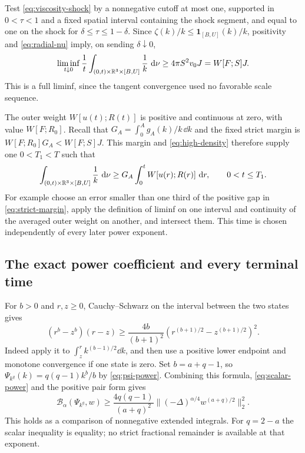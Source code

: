 Test \eqref{eq:viscosity-shock} by a nonnegative cutoff at most one,
supported in $0<\tau<1$ and a fixed spatial interval containing the
shock segment, and equal to one on the shock for
$\delta\leq\tau\leq1-\delta$. Since
$\zeta(k)/k\leq\mathbf1_{[B,U]}(k)/k$, positivity and
\eqref{eq:radial-nu} imply, on sending $\delta\downarrow0$,
\begin{equation}\label{eq:high-density}
 \liminf_{t\downarrow0}\frac1t
 \int_{(0,t)\times\mathbb R^3\times[B,U]}\frac1k\,\,\mathrm d\nu
 \geq4\pi S^2v_0J=W[F;S]J.
\end{equation}
This is a full liminf, since the tangent convergence used no favorable
scale sequence.

The outer weight $W[u(t);R(t)]$ is positive and continuous at zero, with
value $W[F;R_0]$. Recall that $G_A=\int_0^A g_A(k)/k\,\dd k$ and
the fixed strict margin is $W[F;R_0]G_A<W[F;S]J$. This margin and
\eqref{eq:high-density} therefore supply one $0<T_1<T$ such that
\begin{equation}\label{eq:payment}
 \int_{(0,t)\times\mathbb R^3\times[B,U]}\frac1k\,\,\mathrm d\nu
 \geq G_A\int_0^tW[u(r);R(r)]\,\,\mathrm d r,
 \qquad0<t\leq T_1.
\end{equation}
For example choose an error smaller than one third of the positive gap in
\eqref{eq:strict-margin}, apply the definition of liminf on one interval
and continuity of the averaged outer weight on another, and intersect
them. This time is chosen independently of every later power exponent.

\subsection{The exact power coefficient and every terminal time}

For $b>0$ and $r,z\geq0$, Cauchy--Schwarz on the interval between the
two states gives
\begin{equation}\label{eq:scalar-power}
 (r^b-z^b)(r-z)\geq\frac{4b}{(b+1)^2}
       (r^{(b+1)/2}-z^{(b+1)/2})^2.
\end{equation}
Indeed apply it to $\int_z^r k^{(b-1)/2}\dd k$, and then use a positive
lower endpoint and monotone convergence if one state is zero.
Set $b=a+q-1$, so
$\Psi_{k^q}(k)=q(q-1)k^b/b$ by \eqref{eq:psi-power}.
Combining this formula, \eqref{eq:scalar-power} and the positive pair form gives
\begin{equation}\label{eq:power-fractional}
 \mathcal B_\alpha(\Psi_{k^q},w)
 \geq\frac{4q(q-1)}{(a+q)^2}
 \|(-\Delta)^{\alpha/4}w^{(a+q)/2}\|_2^2.
\end{equation}
This holds as a comparison of nonnegative extended integrals. For
$q=2-a$ the scalar inequality is equality; no strict fractional remainder
is available at that exponent.


